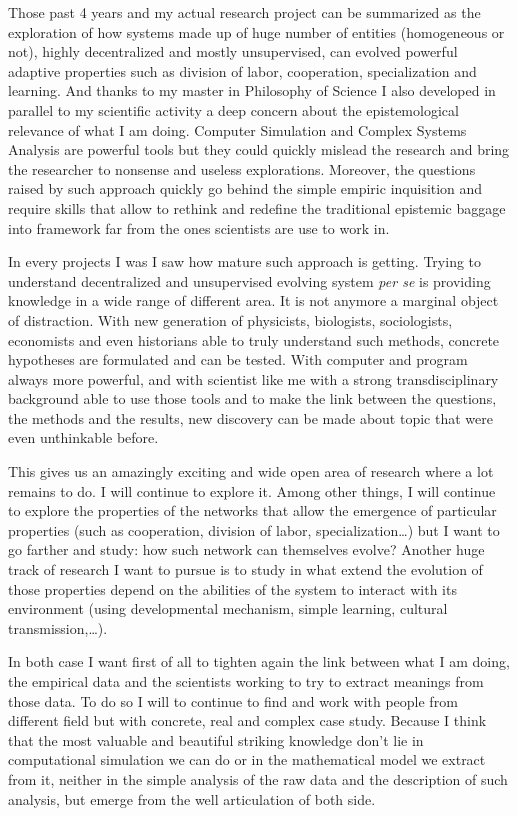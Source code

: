 \documentclass[10pt]{article}
\begin{document}
 Those past 4 years and my actual research project can be summarized as the exploration of how systems made up of huge number of entities (homogeneous or not), highly decentralized and mostly unsupervised, can evolved powerful adaptive properties such as division of labor, cooperation, specialization and learning. And thanks to my master in Philosophy of Science I also developed in parallel to my scientific activity a deep concern about the epistemological relevance of what I am doing. Computer Simulation and Complex Systems Analysis are powerful tools but they could quickly mislead the research and bring the researcher to nonsense and useless explorations. Moreover, the questions raised by such approach quickly go behind the simple empiric inquisition and require skills that allow to rethink and redefine the traditional epistemic baggage into framework far from the ones scientists are use to work in.


In every projects I was I saw how mature such approach is getting. Trying to understand decentralized and unsupervised evolving system \emph{per se} is providing knowledge in a wide range of different area. It is not anymore a marginal object of distraction. With new generation of physicists, biologists, sociologists, economists and even historians able to truly understand such methods, concrete hypotheses are formulated and can be tested. With computer and program always more powerful, and with scientist like me with a strong transdisciplinary background able to use those tools and to make the link between the questions, the methods and the results, new discovery can be made about topic that were even unthinkable before. 


This gives us an amazingly exciting and wide open area of research where a lot remains to do.  I will continue to explore it. Among other things, I will continue to explore the properties of the networks that allow the emergence of particular properties (such as cooperation, division of labor, specialization\ldots) but I want to go farther and study: how such network can themselves evolve? Another huge track of research I want to pursue is to study in what extend the evolution of those properties depend on the abilities of the system to interact with its environment (using developmental mechanism, simple learning, cultural transmission,\ldots). 

In both case I want first of all to tighten again the link between what I am doing, the empirical data and the scientists working to try to extract meanings from those data. To do so I will to continue to find and work with people from different field but with concrete, real and complex case study. Because I think that the most valuable and beautiful striking knowledge don't lie in computational simulation we can do or in the mathematical model we extract from it, neither in the simple analysis of the raw data and the description of such analysis, but emerge from the well articulation of both side.




                   
\end{document}

